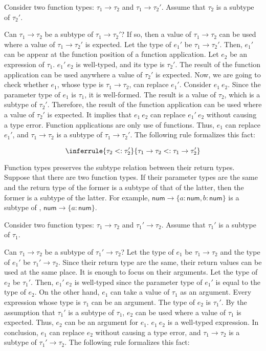 Consider two function types: $\tau_1\rightarrow\tau_2$ and
$\tau_1\rightarrow\tau_2'$. Assume that $\tau_2$ is a subtype of
$\tau_2'$.

Can $\tau_1\rightarrow\tau_2$ be a subtype of $\tau_1\rightarrow\tau_2'$? If
so, then a value of $\tau_1\rightarrow\tau_2$ can be used where a value of
$\tau_1\rightarrow\tau_2'$ is expected. Let the type of $e_1'$ be
$\tau_1\rightarrow\tau_2'$. Then, $e_1'$ can be appear at the function
position of a function application. Let $e_2$ be an expression of $\tau_1$.
$e_1'\ e_2$ is well-typed, and its type is $\tau_2'$. The result of the
function application can be used anywhere a value of $\tau_2'$ is expected.
Now, we are going to check whether $e_1$, whose type is
$\tau_1\rightarrow\tau_2$, can replace $e_1'$. Consider $e_1\ e_2$. Since
the parameter type of $e_1$ is $\tau_1$, it is well-formed. The result is a
value of $\tau_2$, which is a subtype of $\tau_2'$. Therefore, the result of
the function application can be used where a value of $\tau_2'$ is expected.
It implies that $e_1\ e_2$ can replace $e_1'\ e_2$ without causing a type
error. Function applications are only use of functions. Thus, $e_1$ can
replace $e_1'$, and $\tau_1\rightarrow\tau_2$ is a subtype of
$\tau_1\rightarrow\tau_2'$. The following rule formalizes this fact:

\[
\inferrule
{ \tau_2<:\tau_2' }
{ \tau_1\rightarrow\tau_2<:\tau_1\rightarrow\tau_2' }
\]

Function types preserves the subtype relation between their return types.
Suppose that there are two function types. If their parameter types are the same
and the return type of the former is a subtype of that of the latter, then the
former is a subtype of the latter. For example, \(\textsf{num}\rightarrow\{a:\textsf{
num},b:\textsf{num}\}\) is a subtype of , $\textsf{num}\rightarrow\{a:\textsf{num}\}$.

Consider two function types: $\tau_1\rightarrow\tau_2$ and
$\tau_1'\rightarrow\tau_2$. Assume that $\tau_1'$ is a subtype of
$\tau_1$.

Can $\tau_1\rightarrow\tau_2$ be a subtype of $\tau_1'\rightarrow\tau_2$?
Let the type of $e_1$ be $\tau_1\rightarrow\tau_2$ and the type of $e_1'$
be $\tau_1'\rightarrow\tau_2$. Since their return type are the same, their
return values can be used at the same place. It is enough to focus on their
arguments. Let the type of $e_2$ be $\tau_1'$. Then, $e_1'\ e_2$ is
well-typed since the parameter type of $e_1'$ is equal to the type of $e_2$.
On the other hand, $e_1$ can take a value of $\tau_1$ as an argument. Every
expression whose type is $\tau_1$ can be an argument. The type of $e_2$ is
$\tau_1'$. By the assumption that $\tau_1'$ is a subtype of $\tau_1$,
$e_2$ can be used where a value of $\tau_1$ is expected. Thus, $e_2$ can
be an argument for $e_1$. $e_1\ e_2$ is a well-typed expression. In
conclusion, $e_1$ can replace $e_2$ without causing a type error, and
$\tau_1\rightarrow\tau_2$ is a subtype of $\tau_1'\rightarrow\tau_2$. The
following rule formalizes this fact:

